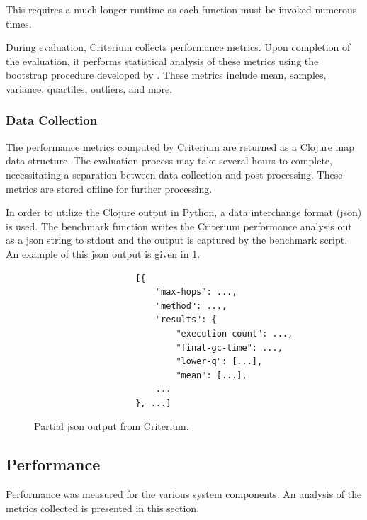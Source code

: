 			This requires a much longer runtime as each function must be invoked numerous times.
			
			During evaluation, Criterium collects performance metrics.  Upon completion of the evaluation, it performs statistical analysis of these metrics using the bootstrap procedure developed by \citeauthor{efron-87} \cite{efron-87}.  These metrics include mean, samples, variance, quartiles, outliers, and more.
		
			\subsubsection{Data Collection}
			\label{sec:data-collection}
				The performance metrics computed by Criterium are returned as a Clojure map data structure.  The evaluation process may take several hours to complete, necessitating a separation between data collection and post-processing.  These metrics are stored offline for further processing.
				
				In order to utilize the Clojure output in Python, a data interchange format (\gls{json}) is used.  The benchmark function writes the Criterium performance analysis out as a \gls{json} string to stdout and the output is captured by the benchmark script.  An example of this \gls{json} output is given in \cref{fig:criterium-json-output}.
				
				\begin{figure}
					\centering %
					\begin{verbatim}
                    [{
                        "max-hops": ...,
                        "method": ...,
                        "results": {
                            "execution-count": ...,
                            "final-gc-time": ...,
                            "lower-q": [...],
                            "mean": [...],
                        ...
                    }, ...]
					\end{verbatim}
					
					\caption{Partial \gls{json} output from Criterium.}
					\label{fig:criterium-json-output}
				\end{figure}
		
		\subsection{Performance}
		\label{sec:performance}
			Performance was measured for the various system components.  An analysis of the metrics collected is presented in this section.
			
